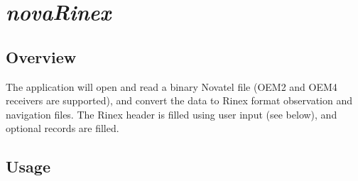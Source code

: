 %
%

\section{\emph{novaRinex}}
\subsection{Overview}
The application will open and read a binary Novatel file
  (OEM2 and OEM4 receivers are supported), and convert the data to Rinex format
  observation and navigation files. The Rinex header is filled using user input
  (see below), and optional records are filled.

\subsection{Usage}

